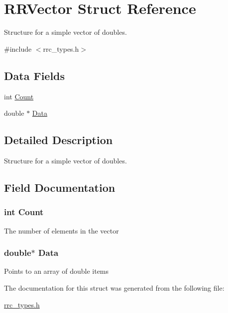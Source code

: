 \hypertarget{struct_r_r_vector}{\section{R\+R\+Vector Struct Reference}
\label{struct_r_r_vector}
}


Structure for a simple vector of doubles.  




{\ttfamily \#include $<$rrc\+\_\+types.\+h$>$}

\subsection*{Data Fields}
\begin{DoxyCompactItemize}
\item 
int \hyperlink{struct_r_r_vector_aad462966ed963f892117056de1eba502}{Count}
\item 
double $\ast$ \hyperlink{struct_r_r_vector_a7c5cbda3aa940f4b0d6e8a1679307dfc}{Data}
\end{DoxyCompactItemize}


\subsection{Detailed Description}
Structure for a simple vector of doubles. 

\subsection{Field Documentation}
\hypertarget{struct_r_r_vector_aad462966ed963f892117056de1eba502}{
\subsubsection[{Count}]{\setlength{\rightskip}{0pt plus 5cm}int Count}}\label{struct_r_r_vector_aad462966ed963f892117056de1eba502}
The number of elements in the vector \hypertarget{struct_r_r_vector_a7c5cbda3aa940f4b0d6e8a1679307dfc}{
\subsubsection[{Data}]{\setlength{\rightskip}{0pt plus 5cm}double$\ast$ Data}}\label{struct_r_r_vector_a7c5cbda3aa940f4b0d6e8a1679307dfc}
Points to an array of double items 

The documentation for this struct was generated from the following file\+:\begin{DoxyCompactItemize}
\item 
\hyperlink{rrc__types_8h}{rrc\+\_\+types.\+h}\end{DoxyCompactItemize}
